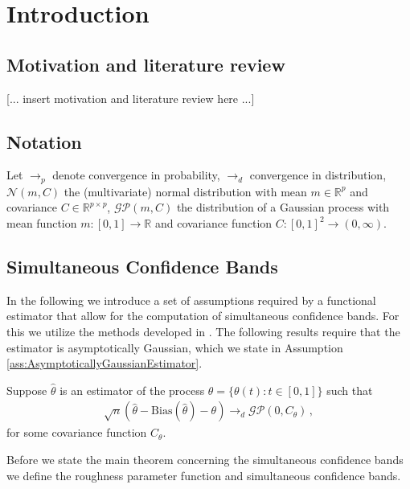 \section{Introduction}


\subsection{Motivation and literature review}

\begin{center}
[... insert motivation and literature review here ...]
\end{center}

\subsection{Notation}

Let $\to_p$ denote convergence in probability, $\to_d$ convergence in distribution,
$\mathcal{N}(m, C)$ the (multivariate) normal distribution with mean $m \in
\mathbb{R}^p$ and covariance $C \in \mathbb{R}^{p \times p}$, $\mathcal{GP}(m, C)$ the
distribution of a Gaussian process with mean function $m:[0, 1] \to \mathbb{R}$ and
covariance function $C:[0, 1]^2 \to (0, \infty)$.


\subsection{Simultaneous Confidence Bands}

In the following we introduce a set of assumptions required by a functional estimator
that allow for the computation of simultaneous confidence bands. For this we utilize the
methods developed in . The following results require that the estimator
is asymptotically Gaussian, which we state in Assumption
\ref{ass:AsymptoticallyGaussianEstimator}.

\begin{assumption}\label{ass:AsymptoticallyGaussianEstimator}
    Suppose $\hat{\theta}$ is an estimator of the process $\theta = \{\theta(t) : t \in
    [0, 1]\}$ such that
    \begin{align*}
        \sqrt{n}(\hat{\theta} - \text{Bias}(\hat{\theta}) - \theta) \to_d
        \mathcal{GP}(0, C_\theta) \,,
    \end{align*}
    for some covariance function $C_\theta$.
\end{assumption}

Before we state the main theorem concerning the simultaneous confidence bands we define
the roughness parameter function and simultaneous confidence bands.

